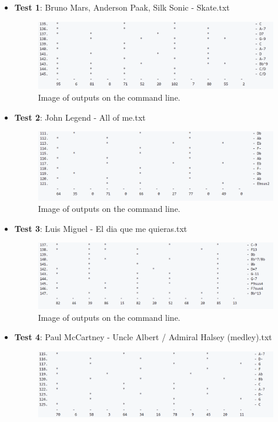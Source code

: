 \documentclass{article}
\begin{document}
\begin{itemize}
    \item \textbf{Test 1}: Bruno Mars, Anderson Paak, Silk Sonic - Skate.txt
    \begin{figure}[H]
        \centering
        \includegraphics[width=1\textwidth]{Image_SkateParsed.png}
        \caption{Image of outputs on the command line.}
    \end{figure}
    \item \textbf{Test 2}: John Legend - All of me.txt
    \begin{figure}[H]
        \centering
        \includegraphics[width=1\textwidth]{Image_AllOfMeParsed.png}
        \caption{Image of outputs on the command line.}
    \end{figure}
    \item \textbf{Test 3}: Luis Miguel - El dia que me quieras.txt
    \begin{figure}[H]
        \centering
        \includegraphics[width=1\textwidth]{Image_ElDiaQueMeQuiera.png}
        \caption{Image of outputs on the command line.}
    \end{figure}
    \item \textbf{Test 4}: Paul McCartney - Uncle Albert / Admiral Halsey (medley).txt
    \begin{figure}[H]
        \centering
        \includegraphics[width=1\textwidth]{Image_AdmiralHalsey.png}

\end{figure}
\end{itemize}
\end{document}
